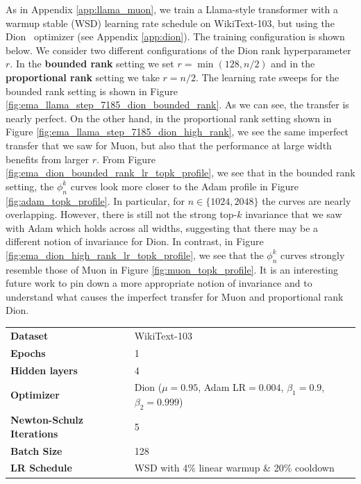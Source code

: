 As in Appendix \ref{app:llama_muon}, we train a Llama-style transformer with a warmup stable (WSD) learning rate schedule on WikiText-103, but using the Dion~\citep{ahn2025dion} optimizer (see Appendix \ref{app:dion}). The training configuration is shown below. We consider two different configurations of the Dion rank hyperparameter $r$. In the \textbf{bounded rank} setting we set $r = \min(128, n / 2)$ and in the \textbf{proportional rank} setting we take $r = n / 2$. The learning rate sweeps for the bounded rank setting is shown in Figure \ref{fig:ema_llama_step_7185_dion_bounded_rank}. As we can see, the transfer is nearly perfect. On the other hand, in the proportional rank setting shown in Figure \ref{fig:ema_llama_step_7185_dion_high_rank}, we see the same imperfect transfer that we saw for Muon, but also that the performance at large width benefits from larger $r$. From Figure \ref{fig:ema_dion_bounded_rank_lr_topk_profile}, we see that in the bounded rank setting, the $\phi_n^k$ curves look more closer to the Adam profile in Figure \ref{fig:adam_topk_profile}. In particular, for $n \in \{1024, 2048\}$ the curves are nearly overlapping. However, there is still not the strong top-$k$ invariance that we saw with Adam which holds across all widths, suggesting that there may be a different notion of invariance for Dion. In contrast, in Figure \ref{fig:ema_dion_high_rank_lr_topk_profile}, we see that the $\phi_n^k$ curves strongly resemble those of Muon in Figure \ref{fig:muon_topk_profile}. It is an interesting future work to pin down a more appropriate notion of invariance and to understand what causes the imperfect transfer for Muon and proportional rank Dion.


\begin{table}[ht]
\centering
\small
\renewcommand{\arraystretch}{1.2}
\begin{tabular}{@{}ll@{}}
\toprule
\textbf{Dataset}       & WikiText-103                                        \\ 
\addlinespace
\textbf{Epochs}        & 1                                                   \\ 
\addlinespace
\textbf{Hidden layers} & 4                                                   \\ 
\addlinespace
\textbf{Optimizer}     & Dion ($\mu=0.95$, Adam LR$=0.004$, $\beta_1 = 0.9$, $\beta_2 = 0.999$) \\ 
\addlinespace
\textbf{Newton-Schulz Iterations} & 5 \\
\addlinespace
\textbf{Batch Size} & 128 \\
\addlinespace
\textbf{LR Schedule}   & WSD with 4\% linear warmup \& 20\% cooldown         \\ 
\bottomrule
\end{tabular}
\end{table}

